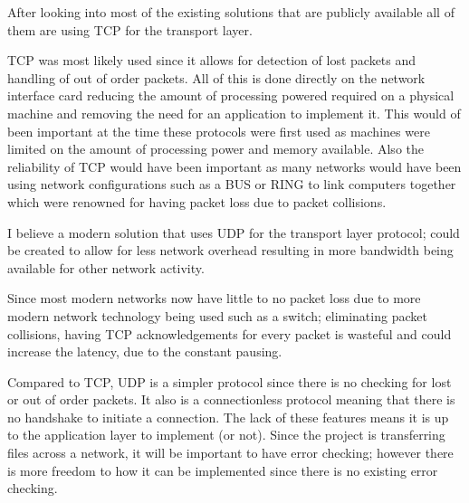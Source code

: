 After looking into most of the existing solutions that are publicly available all of them are using TCP for the transport layer.

TCP was most likely used since it allows for detection of lost packets and handling of out of order packets. All of this is done directly on the network interface card reducing the amount of processing powered required on a physical machine and removing the need for an application to implement it. This would of been important at the time these protocols were first used as machines were limited on the amount of processing power and memory available. Also the reliability of TCP would have been important as many networks would have been using network configurations such as a BUS or RING to link computers together which were renowned for having packet loss due to packet collisions.

I believe a modern solution that uses UDP for the transport layer protocol; could be created to allow for less network overhead resulting in more bandwidth being available for other network activity.

Since most modern networks now have little to no packet loss due to more modern network technology being used such as a switch; eliminating packet collisions, having TCP acknowledgements for every packet is wasteful and could increase the latency, due to the constant pausing.

Compared to TCP, UDP is a simpler protocol since there is no checking for lost or out of order packets. It also is a connectionless protocol meaning that there is no handshake to initiate a connection. The lack of these features means it is up to the application layer to implement (or not). Since the project is transferring files across a network, it will be important to have error checking; however there is more freedom to how it can be implemented since there is no existing error checking.
